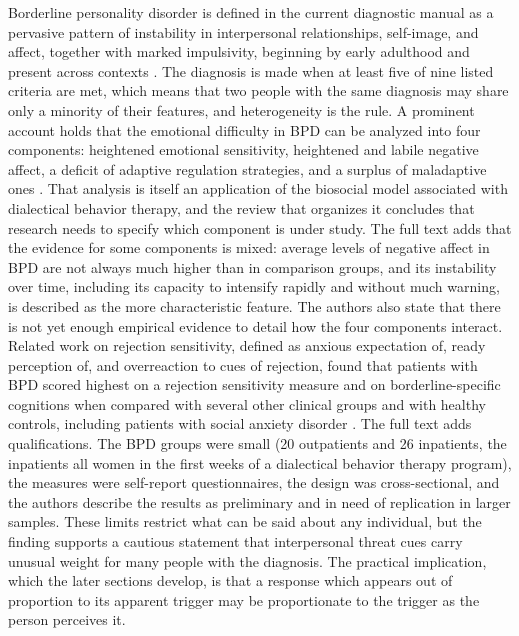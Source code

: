 \documentclass[11pt]{article}
\theoremstyle{definition}
\theoremstyle{remark}
\begin{document}
Borderline personality disorder is defined in the current diagnostic manual as a pervasive pattern of instability in interpersonal relationships, self-image, and affect, together with marked impulsivity, beginning by early adulthood and present across contexts \citep{dsm5tr}. The diagnosis is made when at least five of nine listed criteria are met, which means that two people with the same diagnosis may share only a minority of their features, and heterogeneity is the rule. A prominent account holds that the emotional difficulty in BPD can be analyzed into four components: heightened emotional sensitivity, heightened and labile negative affect, a deficit of adaptive regulation strategies, and a surplus of maladaptive ones \citep{carpenter2013}. That analysis is itself an application of the biosocial model associated with dialectical behavior therapy, and the review that organizes it concludes that research needs to specify which component is under study. The full text adds that the evidence for some components is mixed: average levels of negative affect in BPD are not always much higher than in comparison groups, and its instability over time, including its capacity to intensify rapidly and without much warning, is described as the more characteristic feature. The authors also state that there is not yet enough empirical evidence to detail how the four components interact. Related work on rejection sensitivity, defined as anxious expectation of, ready perception of, and overreaction to cues of rejection, found that patients with BPD scored highest on a rejection sensitivity measure and on borderline-specific cognitions when compared with several other clinical groups and with healthy controls, including patients with social anxiety disorder \citep{staebler2011}. The full text adds qualifications. The BPD groups were small (20 outpatients and 26 inpatients, the inpatients all women in the first weeks of a dialectical behavior therapy program), the measures were self-report questionnaires, the design was cross-sectional, and the authors describe the results as preliminary and in need of replication in larger samples. These limits restrict what can be said about any individual, but the finding supports a cautious statement that interpersonal threat cues carry unusual weight for many people with the diagnosis. The practical implication, which the later sections develop, is that a response which appears out of proportion to its apparent trigger may be proportionate to the trigger as the person perceives it.
\end{document}
